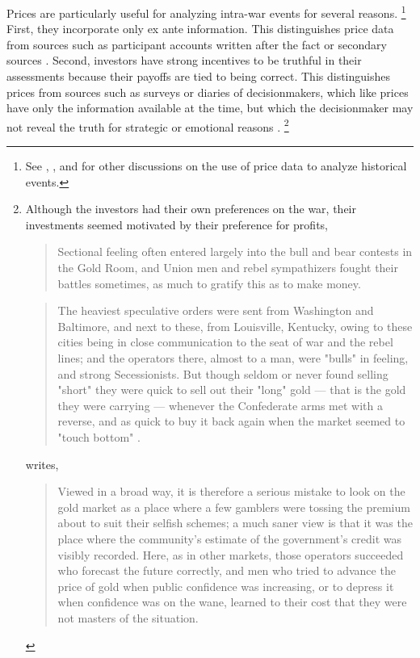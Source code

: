 Prices are particularly useful for analyzing intra-war events for
several reasons.%
\footnote{See \textcite{WillardGuinnaneEtAl1996}, \textcite{north2000introd}, and \textcite{FreyKucher2000} for other  discussions on the use of price data to analyze historical events.} %
First, they incorporate only ex ante information. This distinguishes price data from sources such as participant accounts written after the fact or secondary sources \parencites[1001]{WillardGuinnaneEtAl1996}[][188]{FreyKucher2000a}.
Second, investors have strong incentives to be truthful in their assessments because their payoffs are tied to being correct.
This distinguishes prices from sources such as surveys or diaries of decisionmakers, which like prices have only the information available at the time, but which the decisionmaker may not reveal the truth for strategic or emotional reasons \parencite[57]{Reiter2009}.%
\footnote{Although the investors had their own preferences on the war,
  their investments seemed motivated by their preference for profits,
  \begin{quote}
    Sectional feeling often entered largely into the bull and bear
    contests in the Gold Room, and Union men and rebel sympathizers fought
    their battles sometimes, as much to gratify this as to make money.
    \textcite[7]{Cornwallis1879}
  \end{quote}
  \begin{quote}
    The heaviest speculative orders were sent from Washington and
    Baltimore, and next to these, from Louisville, Kentucky, owing to
    these cities being in close communication to the seat of war and the
    rebel lines; and the operators there, almost to a man, were "bulls"
    in feeling, and strong Secessionists.  But though seldom or never
    found selling "short" they were quick to sell out their "long" gold
    --- that is the gold they were carrying --- whenever the Confederate
    arms met with a reverse, and as quick to buy it back again when the
    market seemed to "touch bottom" \textcite[5]{Cornwallis1879}.
  \end{quote}
  \textcite[210]{Mitchell1903} writes,
  \begin{quote}
    Viewed in a broad way, it is therefore a serious
    mistake to look on the gold market as a place where a few gamblers
    were tossing the premium about to suit their selfish schemes; a much
    saner view is that it was the place where the community's estimate
    of the government's credit was visibly recorded. Here, as in other
    markets, those operators succeeded who forecast the future
    correctly, and men who tried to advance the price of gold when
    public confidence was increasing, or to depress it when confidence
    was on the wane, learned to their cost that they were not masters of
    the situation.
  \end{quote}
} %
